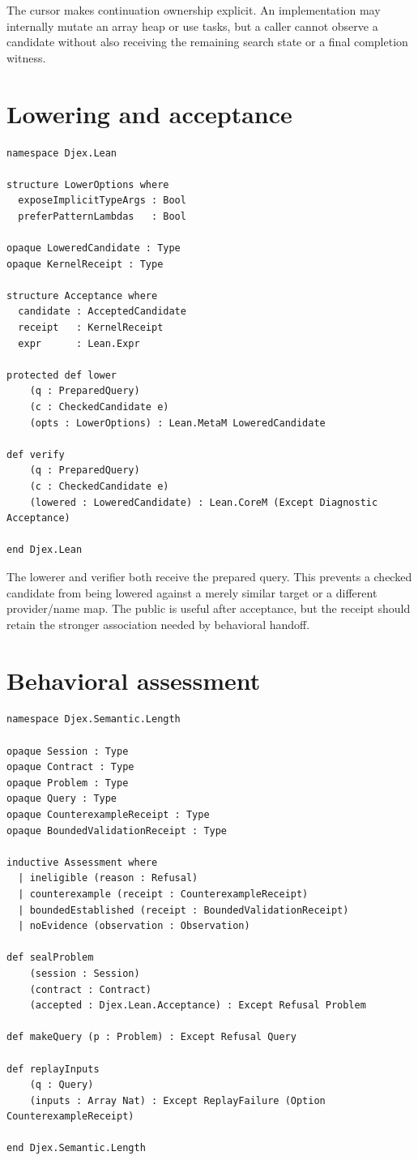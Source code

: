 \documentclass[10pt,letterpaper,oneside]{report}
\newcommand{\code}[1]{\texttt{\detokenize{#1}}}
\begin{document}
The cursor makes continuation ownership explicit. An implementation may internally mutate an array heap or use tasks, but a caller cannot observe a candidate without also receiving the remaining search state or a final completion witness.

\section{Lowering and acceptance}

\begin{lstlisting}[language=Leanish]
namespace Djex.Lean

structure LowerOptions where
  exposeImplicitTypeArgs : Bool
  preferPatternLambdas   : Bool

opaque LoweredCandidate : Type
opaque KernelReceipt : Type

structure Acceptance where
  candidate : AcceptedCandidate
  receipt   : KernelReceipt
  expr      : Lean.Expr

protected def lower
    (q : PreparedQuery)
    (c : CheckedCandidate e)
    (opts : LowerOptions) : Lean.MetaM LoweredCandidate

def verify
    (q : PreparedQuery)
    (c : CheckedCandidate e)
    (lowered : LoweredCandidate) : Lean.CoreM (Except Diagnostic Acceptance)

end Djex.Lean
\end{lstlisting}

The lowerer and verifier both receive the prepared query. This prevents a checked candidate from being lowered against a merely similar target or a different provider/name map. The public \code{expr} is useful after acceptance, but the receipt should retain the stronger association needed by behavioral handoff.

\section{Behavioral assessment}

\begin{lstlisting}[language=Leanish]
namespace Djex.Semantic.Length

opaque Session : Type
opaque Contract : Type
opaque Problem : Type
opaque Query : Type
opaque CounterexampleReceipt : Type
opaque BoundedValidationReceipt : Type

inductive Assessment where
  | ineligible (reason : Refusal)
  | counterexample (receipt : CounterexampleReceipt)
  | boundedEstablished (receipt : BoundedValidationReceipt)
  | noEvidence (observation : Observation)

def sealProblem
    (session : Session)
    (contract : Contract)
    (accepted : Djex.Lean.Acceptance) : Except Refusal Problem

def makeQuery (p : Problem) : Except Refusal Query

def replayInputs
    (q : Query)
    (inputs : Array Nat) : Except ReplayFailure (Option CounterexampleReceipt)

end Djex.Semantic.Length
\end{lstlisting}
\end{document}
